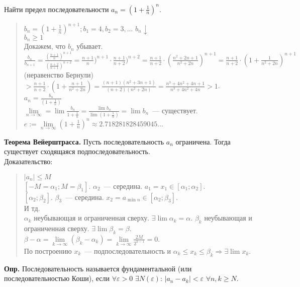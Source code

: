 \documentclass{article}
\begin{document}
	Найти предел последовательности $a_n = (1 + \frac{1}{n})^n$.
	\begin{quote}
		$b_n = (1 + \frac{1}{n})^{n + 1}; b_1 = 4, b_2 = 3,...$ $b_n \downarrow$ \\
		$b_n \geqslant 1$ \\
		Докажем, что $b_n$ убывает. \\
		$\frac{b_n}{b_{n + 1}} = \frac{(\frac{n + 1}{n})^{n + 1}}{(\frac{n + 2}{n + 1})^{n + 2}} = \frac{n + 1}{n})^{n + 1} \cdot \frac{n + 1}{n + 2})^{n + 2} = \frac{n + 1}{n + 2} \cdot (\frac{n^2 + 2n + 1}{n^2 + 2n})^{n + 1} = \frac{n + 1}{n + 2} \cdot (1 + \frac{1}{n^2 + 2n})^{n + 1}$ (неравенство Бернули) $> \frac{n + 1}{n + 2} \cdot (1 + \frac{n + 1}{n^2 + 2n}) = \frac{(n + 1)(n^2 + 3n + 1)}{(n + 2)(n^2 + 2n)} = \frac{n^3 + 4n^2 + 4n + 1}{n^3 + 4n^2 + 4n} > 1$. \\
		$a_n = \frac{b_n}{(1 + \frac{1}{n})}$ \\
		$\lim\limits_{n \rightarrow \infty} = \lim \frac{b_n}{1 + \frac{1}{n}} = \frac{\lim b_n}{\lim (1 + \frac{1}{n})} = \lim b_n$~--- существует. \\
		$e := \lim\limits_{n \rightarrow \infty} (1 + \frac{1}{n})^n \approx 2.718281828459045...$
	\end{quote}
	\textbf{Теорема Вейерштрасса.} Пусть последовательность $a_n$ ограничена. Тогда существует сходящаяся подпоследовательность. \\
	Доказательство:
	\begin{quote}
		$|a_n| \leqslant M$ \\
		$[-M = \alpha_1; M = \beta_1]$. $\alpha_2$~--- середина. $a_1 = x_1 \in [\alpha_1; \alpha_2]$. \\
		$[\alpha_2; \beta_2]$. $\beta_3$~--- середина. $x_2 = a_{\min n} \in [\alpha_2; \beta_3]$. \\
		И тд. \\
		${\alpha_k}$ неубывающая и ограниченная сверху. $\exists \lim \alpha_k = \alpha$. ${\beta_k}$ неубывающая и ограниченная сверху. $\exists \lim \beta_k = \beta$. \\
		$\beta - \alpha = \lim \limits_{k \rightarrow \infty} (\beta_k - \alpha_k) = \lim \limits_{k \rightarrow \infty} \frac{2M}{2^{k - 1}} = 0$. \\
		По построению $x_k$~--- подпоследовательность и $\alpha_k \leqslant x_k \leqslant \beta_k \Rightarrow \exists \lim x_k$.
	\end{quote}
	\textbf{Опр.} Последовательность называется фундаментальной (или последовательностью Коши), если $\forall \varepsilon > 0$ $\exists N(\varepsilon)$: $|a_n - a_k| < \varepsilon$ $\forall n, k \geqslant N$. \\
\end{document}
